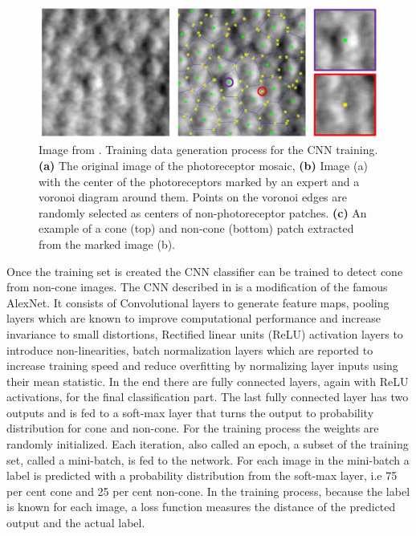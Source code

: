 \documentclass[]{article}
\begin{document}
\begin{figure}[h]
	\centering
	\includegraphics[width=\textwidth]{cunefare_generating_data.png}
	\caption{Image from \cite{cunefare_open_2017}. Training data generation process for the CNN training. \textbf{(a)} The original image of the 
	photoreceptor mosaic, \textbf{(b)} Image (a) with the center of the photoreceptors marked by an expert and a voronoi diagram around them. Points on the voronoi edges are randomly selected as centers of non-photoreceptor patches. 
    \textbf{(c)} An example of a cone (top) and non-cone (bottom) patch extracted from the marked image (b).}
	\label{fig:cunefare-training-data-generation}
\end{figure}


Once the training set is created the CNN classifier can be trained to detect cone from non-cone images.
The CNN described in\cite{cunefare_open_2017} is a modification of the famous AlexNet\cite{krizhevsky_imagenet_2012}.
It consists of Convolutional layers to generate feature maps, pooling layers which are known to improve computational performance and increase invariance to small distortions\cite{jarrett_what_2009},
Rectified linear units (ReLU) activation layers to introduce non-linearities\cite{jarrett_what_2009},
batch normalization layers which are reported to increase training speed and reduce overfitting by normalizing layer inputs using their mean statistic\cite{ioffe_batch_2015}.
In the end there are fully connected  layers, again with ReLU activations, for the final classification part.
The last fully connected layer has two outputs and is fed to a soft-max layer that turns the output to probability distribution for cone and non-cone\cite{bishop_pattern_recognition_2006}.
For the training process the weights are randomly initialized. 
Each iteration, also called an epoch, a subset of the training set, called a mini-batch, is fed to the network.
For each image in the mini-batch a label is predicted with a probability distribution from the soft-max layer, i.e 75 per cent cone and 25 per cent non-cone.
In the training process, because the label is known for each image, 
a loss function measures the distance of the predicted output and the actual label.
\end{document}
